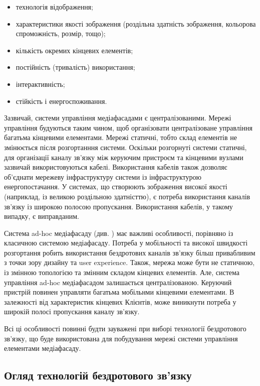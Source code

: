 \documentclass[a4paper,ukrainian,utf8,nocolumnsxix,floatsection,equationsection]{eskdtext}
\begin{document}
\begin{itemize}
	\item технологія відображення;
	\item характеристики якості зображення (роздільна здатність зображення, кольорова спроможність, розмір, тощо);
	\item кількість окремих кінцевих елементів;
	\item постійність (тривалість) використання;
	\item інтерактивність;
	\item стійкість і енергоспоживання.
\end{itemize}

Зазвичай, системи управління медіафасадами є централізованими. Мережі управління будуються таким чином, щоб організовати централізоване управління багатьма кінцевими елементами. Мережі статичні, тобто склад елементів не змінюється після розгортанння системи. Оскільки розгорнуті системи статичні, для організації каналу зв’язку між керуючим пристроєм та кінцевими вузлами зазвичай використовуються кабелі. Використання кабелів також дозволяє об’єднати мережеву інфраструктуру системи із інфраструктурою енергопостачання. У системах, що створюють зображення високої якості (наприклад, із великою роздільною здатністтю), є потреба використання каналів зв’язку із широкою полосою пропускання. Використання кабелів, у такому випадку, є виправданим.

Система ad-hoc медіафасаду (див. \cite{idaacs:2013:adhoc:media:facade}) має важливі особливості, порівняно із класичною системою медіафасаду. Потреба у мобільності та високої швидкості розгортання робить використання бездротових каналів зв’язку більш привабливим з точки зору дизайну та user experience. Також, мережа може бути не статичною, із змінною топологією та змінним складом кінцевих елементів. Але, система управління ad-hoc медіафасадом залишається централізованою. Керуючий пристрій повинен управляти багатьма мобільнми кінцевими елементами. В залежності від характеристик кінцевих Клієнтів, може виникнути потреба у широкій полосі пропускання каналу зв’язку. 

Всі ці особливості повинні будти зауважені при виборі технології бездротового зв’язку, що буде використована для побудування мережі системи управління елементами медіафасаду.


\subsection{Огляд технологій бездротового зв’язку}
\end{document}
